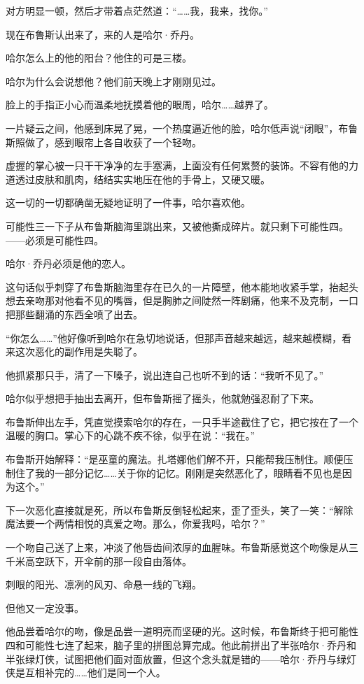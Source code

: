 \documentclass[../main.tex]{subfiles}
\begin{document}
对方明显一顿，然后才带着点茫然道：“……我，我来，找你。”

现在布鲁斯认出来了，来的人是哈尔·乔丹。

哈尔怎么上的他的阳台？他住的可是三楼。

哈尔为什么会说想他？他们前天晚上才刚刚见过。

脸上的手指正小心而温柔地抚摸着他的眼周，哈尔……越界了。

一片疑云之间，他感到床晃了晃，一个热度逼近他的脸，哈尔低声说“闭眼”，布鲁斯照做了，感到眼帘上各自收获了一个轻吻。

虚握的掌心被一只干干净净的左手塞满，上面没有任何累赘的装饰。不容有他的力道透过皮肤和肌肉，结结实实地压在他的手骨上，又硬又暖。

这一切的一切都确凿无疑地证明了一件事，哈尔喜欢他。

可能性三一下子从布鲁斯脑海里跳出来，又被他撕成碎片。就只剩下可能性四。——必须是可能性四。

哈尔·乔丹必须是他的恋人。

这句话似乎刺穿了布鲁斯脑海里存在已久的一片障壁，他本能地收紧手掌，抬起头想去亲吻那对他看不见的嘴唇，但是胸肺之间陡然一阵剧痛，他来不及克制，一口把那些翻涌的东西全喷了出去。

“你怎么……”他好像听到哈尔在急切地说话，但那声音越来越远，越来越模糊，看来这次恶化的副作用是失聪了。

他抓紧那只手，清了一下嗓子，说出连自己也听不到的话：“我听不见了。”

哈尔似乎想把手抽出去离开，但布鲁斯摇了摇头，他就勉强忍耐了下来。

布鲁斯伸出左手，凭直觉摸索哈尔的存在，一只手半途截住了它，把它按在了一个温暖的胸口。掌心下的心跳不疾不徐，似乎在说：“我在。”

布鲁斯开始解释：“是巫童的魔法。扎塔娜他们解不开，只能帮我压制住。顺便压制住了我的一部分记忆……关于你的记忆。刚刚是突然恶化了，眼睛看不见也是因为这个。”

下一次恶化直接就是死，所以布鲁斯反倒轻松起来，歪了歪头，笑了一笑：“解除魔法要一个两情相悦的真爱之吻。那么，你爱我吗，哈尔？”

一个吻自己送了上来，冲淡了他唇齿间浓厚的血腥味。布鲁斯感觉这个吻像是从三千米高空跃下，开伞前的那一段自由落体。

刺眼的阳光、凛冽的风刃、命悬一线的飞翔。

但他又一定没事。

他品尝着哈尔的吻，像是品尝一道明亮而坚硬的光。这时候，布鲁斯终于把可能性四和可能性七连了起来，脑子里的拼图总算完成。他此前拼出了半张哈尔·乔丹和半张绿灯侠，试图把他们面对面放置，但这个念头就是错的——哈尔·乔丹与绿灯侠是互相补完的……他们是同一个人。
\end{document}
